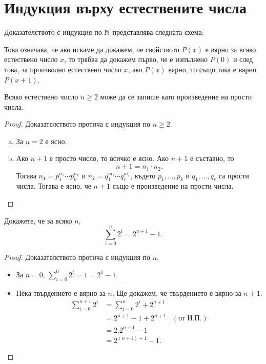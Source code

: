 \section{Индукция върху естествените числа}

Доказателството с индукция по $\Nat$ представлява следната схема:
\begin{prooftree}
\end{prooftree}

Това означава, че ако искаме да докажем, че свойството $P(x)$ е вярно за всяко естествено число $x$,
то трябва да докажем първо, че е изпълнено $P(0)$ и след това, за произволно естествено число $x$, ако $P(x)$ вярно, то също така е вярно $P(x+1)$.

\begin{problem}
  \label{prob:number-prod-prime}  
  Всяко естествено число $n \geq 2$ може да се запише като произведение на прости числа.
\end{problem}
\begin{proof}
  Доказателството протича с индукция по $n \geq 2$.
  \begin{enumerate}[a)]
  \item 
    За $n = 2$  е ясно.
  \item
    Ако $n+1$ е просто число, то всичко е ясно.
    Ако $n+1$ е съставно, то \[n + 1 = n_1\cdot n_2.\]
    Тогава $n_1 = p^{n_1}_1\cdots p^{n_k}_k$ и $n_2 = q^{m_1}_1\cdots q^{m_r}_r$,
    където $p_1,\dots,p_k$ и $q_1,\dots,q_r$ са прости числа.
    Тогава е ясно, че $n+1$ също е произведение на прости числа.
  \end{enumerate}
\end{proof}

\begin{problem}
  Докажете, че за всяко $n$, 
  \[\sum^n_{i=0} 2^i = 2^{n+1} - 1.\]
\end{problem}
\begin{proof}
  Доказателството протича с индукция по $n$.
  \begin{itemize}
  \item 
    За $n = 0$, $\sum^0_{i=0}2^i = 1 = 2^{1} - 1$.
  \item
    Нека твърдението е вярно за $n$.
    Ще докажем, че твърдението е вярно за $n+1$.
    \begin{align*}
      \sum^{n+1}_{i=0} 2^i & = \sum^{n}_{i=0}2^i + 2^{n+1}\\
      & = 2^{n+1} - 1 + 2^{n+1} & (\text{от И.П.})\\
      & = 2.2^{n+1} - 1 \\
      & = 2^{(n+1)+1} - 1.
    \end{align*}
  \end{itemize}
\end{proof}

